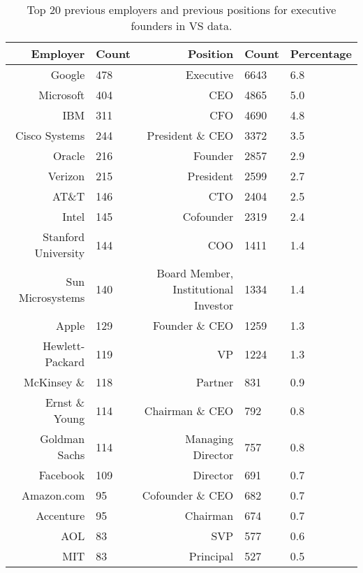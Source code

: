 \begin{table}[!htb]
\centering
\begingroup\footnotesize
\begin{tabular}{rlrll}
  \toprule
Employer & Count & Position & Count & Percentage \\ 
  \midrule
Google & 478 & Executive & 6643 & 6.8 \\ 
  Microsoft & 404 & CEO & 4865 & 5.0 \\ 
  IBM & 311 & CFO & 4690 & 4.8 \\ 
  Cisco Systems & 244 & President \& CEO & 3372 & 3.5 \\ 
  Oracle & 216 & Founder & 2857 & 2.9 \\ 
  Verizon & 215 & President & 2599 & 2.7 \\ 
  AT\&T & 146 & CTO & 2404 & 2.5 \\ 
  Intel & 145 & Cofounder & 2319 & 2.4 \\ 
  Stanford University & 144 & COO & 1411 & 1.4 \\ 
  Sun Microsystems & 140 & Board Member, Institutional Investor & 1334 & 1.4 \\ 
  Apple & 129 & Founder \& CEO & 1259 & 1.3 \\ 
  Hewlett-Packard & 119 & VP & 1224 & 1.3 \\ 
  McKinsey \& & 118 & Partner & 831 & 0.9 \\ 
  Ernst \& Young & 114 & Chairman \& CEO & 792 & 0.8 \\ 
  Goldman Sachs & 114 & Managing Director & 757 & 0.8 \\ 
  Facebook & 109 & Director & 691 & 0.7 \\ 
  Amazon.com & 95 & Cofounder \& CEO & 682 & 0.7 \\ 
  Accenture & 95 & Chairman & 674 & 0.7 \\ 
  AOL & 83 & SVP & 577 & 0.6 \\ 
  MIT & 83 & Principal & 527 & 0.5 \\ 
   \bottomrule
\end{tabular}
\endgroup
\caption{Top 20 previous employers and previous positions for executive founders in VS data.} 
\label{table:VS_previousEmployersSummaryTable}
\end{table}
